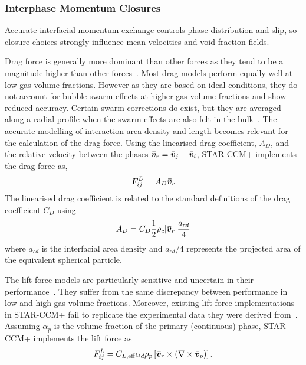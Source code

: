 \subsubsection{Interphase Momentum Closures}
Accurate interfacial momentum exchange controls phase distribution and slip, so 
 closure choices strongly influence mean velocities and void-fraction fields.

Drag force is generally more dominant than other forces as they tend to be a magnitude
 higher than other forces~\cite{tas-koehlerCriticalAnalysisDrag2021a}. Most drag models perform 
 equally well at low gas volume fractions. However as they are based on ideal conditions, 
 they do not account for bubble swarm effects at higher gas volume fractions and show reduced 
 accuracy. Certain swarm corrections do exist, but they are averaged along a radial profile when
 the swarm effects are also felt in the bulk~\cite{sugrueRobustMomentumClosure, sugrueAssessmentSimplifiedSet2017,colomboBenchmarkingCFDModelling}.
 The accurate modelling of interaction area density and length becomes relevant for the calculation
 of the drag force. 
 Using the linearised drag coefficient, \(A_{D}\), and the relative velocity between the phases
 \(\bm{\bar{v}}_{r} = \bm{\bar{v}}_{j} - \bm{\bar{v}}_{i}\), STAR-CCM+ implements the drag force as,
 \begin{equation}
   \bm{\bar{F}}_{ij}^{D} = A_{D}\bm{\bar{v}}_{r}
 \end{equation}
 The linearised drag coefficient is related to the standard definitions of the drag 
 coefficient \(C_{D}\) using
 \begin{equation}
   A_{D} = C_{D} \frac{1}{2} \rho_{c} |\bm{\bar{v}}_{r}| \frac{a_{cd}}{4}
 \end{equation}
 where \(a_{cd}\) is the interfacial area density and \(a_{cd}/4\) represents the projected area of
 the equivalent spherical particle. 

The lift force models are particularly sensitive and uncertain in their performance~\cite{sugrueAssessmentSimplifiedSet2017}.
 They suffer from the same discrepancy between performance in low and 
 high gas volume fractions. Moreover, existing 
 lift force implementations in STAR-CCM+ fail to replicate the experimental data
 they were derived from~\cite{sugrueRobustMomentumClosure}.
 Assuming \(\alpha_{p}\) is the volume fraction of the primary (continuous)
 phase, STAR-CCM+ implements the lift force as
 \begin{equation}
   F_{ij}^{L} = C_{L,\text{eff}} \alpha_{d} \rho_{p} 
   \left[\bm{\bar{v}}_{r} \times \left(\nabla \times \bm{\bar{v}}_{p}\right)\right].
 \end{equation} 


